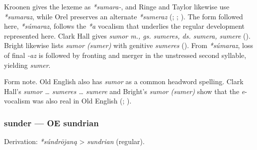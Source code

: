 \documentclass[
  british,
  a4paper,
]{article}
\begin{document}
Kroonen gives the lexeme as \emph{*sumara-}, and Ringe and Taylor
likewise use \emph{*sumaraz}, while Orel preserves an alternate
\emph{*sumeraz} (;
;
). The form followed here,
\emph{*súmaraz}, follows the \emph{*a} vocalism that underlies the
regular development represented here. Clark Hall gives \emph{sumor m.,
gs. sumeres, ds. sumera, sumere} (). Bright likewise lists \emph{sumor (sumer)} with
genitive \emph{sumeres} (). From \emph{*súmaraz}, loss of final \emph{-az} is followed
by fronting and merger in the unstressed second syllable, yielding
\emph{sumer}.

Form note. Old English also has \emph{sumor} as a common headword
spelling. Clark Hall's \emph{sumor \ldots{} sumeres \ldots{} sumere} and
Bright's \emph{sumor (sumer)} show that the \emph{e}-vocalism was also
real in Old English (;
).

\subsubsection{sunder --- OE sundrian}\label{sunder-oe-sundrian}

Derivation: \emph{*súndrōjaną} \textgreater{} \emph{sundrian} (regular).

\begingroup
\setlength{\fboxsep}{6pt}
\end{document}
